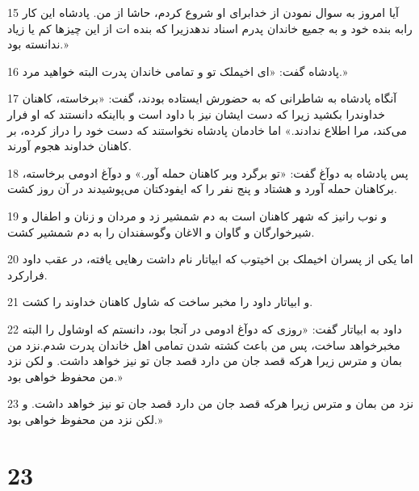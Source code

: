 \par 15 آیا امروز به سوال نمودن از خدابرای او شروع کردم، حاشا از من. پادشاه این کار رابه بنده خود و به جمیع خاندان پدرم اسناد ندهدزیرا که بنده ات از این چیزها کم یا زیاد ندانسته بود.»
\par 16 پادشاه گفت: «ای اخیملک تو و تمامی خاندان پدرت البته خواهید مرد.» 
\par 17 آنگاه پادشاه به شاطرانی که به حضورش ایستاده بودند، گفت: «برخاسته، کاهنان خداوندرا بکشید زیرا که دست ایشان نیز با داود است و بااینکه دانستند که او فرار می‌کند، مرا اطلاع ندادند.» اما خادمان پادشاه نخواستند که دست خود را دراز کرده، بر کاهنان خداوند هجوم آورند.
\par 18 پس پادشاه به دوآغ گفت: «تو برگرد وبر کاهنان حمله آور.» و دوآغ ادومی برخاسته، برکاهنان حمله آورد و هشتاد و پنج نفر را که ایفودکتان می‌پوشیدند در آن روز کشت.
\par 19 و نوب رانیز که شهر کاهنان است به دم شمشیر زد و مردان و زنان و اطفال و شیرخوارگان و گاوان و الاغان وگوسفندان را به دم شمشیر کشت.
\par 20 اما یکی از پسران اخیملک بن اخیتوب که ابیاتار نام داشت رهایی یافته، در عقب داود فرارکرد.
\par 21 و ابیاتار داود را مخبر ساخت که شاول کاهنان خداوند را کشت.
\par 22 داود به ابیاتار گفت: «روزی که دوآغ ادومی در آنجا بود، دانستم که اوشاول را البته مخبر‌خواهد ساخت، پس من باعث کشته شدن تمامی اهل خاندان پدرت شدم.نزد من بمان و مترس زیرا هر‌که قصد جان من دارد قصد جان تو نیز خواهد داشت. و لکن نزد من محفوظ خواهی بود.»
\par 23 نزد من بمان و مترس زیرا هر‌که قصد جان من دارد قصد جان تو نیز خواهد داشت. و لکن نزد من محفوظ خواهی بود.»
 
\chapter{23}

